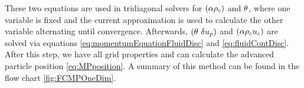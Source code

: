 \color{black}
These two equations are used in tridiagonal solvers for $(\alpha \rho_c)$ and $\theta$, where one variable is fixed and the current approximation is used to calculate the other variable alternating until convergence.
Afterwards, $(\theta \ \delta u_p)$ and $(\alpha \rho_c u_c)$ are solved via equations \eqref{eq:momentumEquationFluidDisc} and \eqref{eq:fluidContDisc}.
After this step, we have all grid properties and can calculate the advanced particle position \eqref{eq:MPposition}. %
A summary of this method can be found in the flow chart \ref{fig:FCMPOneDim}.

